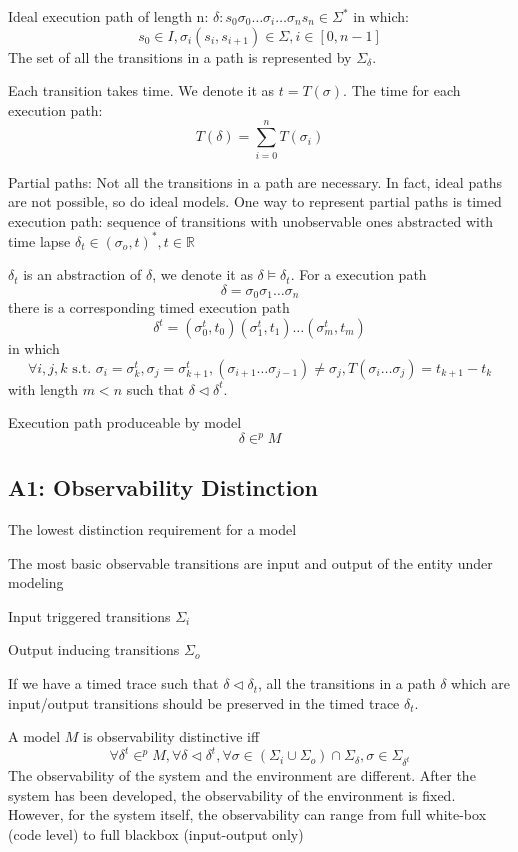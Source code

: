 \documentclass{llncs}
\begin{document}
Ideal execution path of length n: $\delta:s_0\sigma_0\dots\sigma_i\dots\sigma_ns_n\in\Sigma^*$ in which: 
$$s_0\in I, \sigma_i(s_i,s_{i+1})\in\Sigma, i\in[0,n-1]$$ 
The set of all the transitions in a path is represented by $\Sigma_\delta$.

Each transition takes time. We denote it as $t=T(\sigma)$. The time for each execution path: $$T(\delta)=\sum_{i=0}^nT(\sigma_i)$$

Partial paths: Not all the transitions in a path are necessary. In fact, ideal paths are not possible, so do ideal models. One way to represent partial paths is timed execution path: sequence of transitions with unobservable ones abstracted with time lapse $\delta_t\in(\sigma_o,t)^*, t\in \mathbb{R}$

$\delta_t$ is an abstraction of $\delta$, we denote it as $\delta\models\delta_t$. For a execution path 
$$\delta=\sigma_0\sigma_1\dots\sigma_n$$
there is a corresponding timed execution path 
$$\delta^t=(\sigma_0^t,t_0)(\sigma_1^t,t_1)\dots(\sigma_m^t,t_m)$$ 
in which
$$\forall i,j,k \text{ s.t. } \sigma_i=\sigma_k^t,\sigma_j=\sigma_{k+1}^t,(\sigma_{i+1}\dots\sigma_{j-1})\neq\sigma_{j},T(\sigma_i\dots\sigma_j)=t_{k+1}-t_k$$
with length $m<n$ such that $\delta\triangleleft\delta^t$. 

Execution path produceable by model
$$\delta\in^p M$$
\subsection{A1: Observability Distinction}
The lowest distinction requirement for a model

The most basic observable transitions are input and output of the entity under modeling

Input triggered transitions $\Sigma_i$

Output inducing transitions $\Sigma_o$

If we have a timed trace such that $\delta\triangleleft\delta_t$, all the transitions in a path $\delta$ which are input/output transitions should be preserved in the timed trace $\delta_t$. 

A model $M$ is observability distinctive iff
$$\forall\delta^t\in^p M, \forall\delta\triangleleft\delta^t,\forall \sigma\in(\Sigma_i\cup\Sigma_o)\cap\Sigma_\delta,\sigma\in\Sigma_{\delta^t}$$
The observability of the system and the environment are different. After the system has been developed, the observability of the environment is fixed. However, for the system itself, the observability can range from full white-box (code level) to full blackbox (input-output only)
\end{document}

